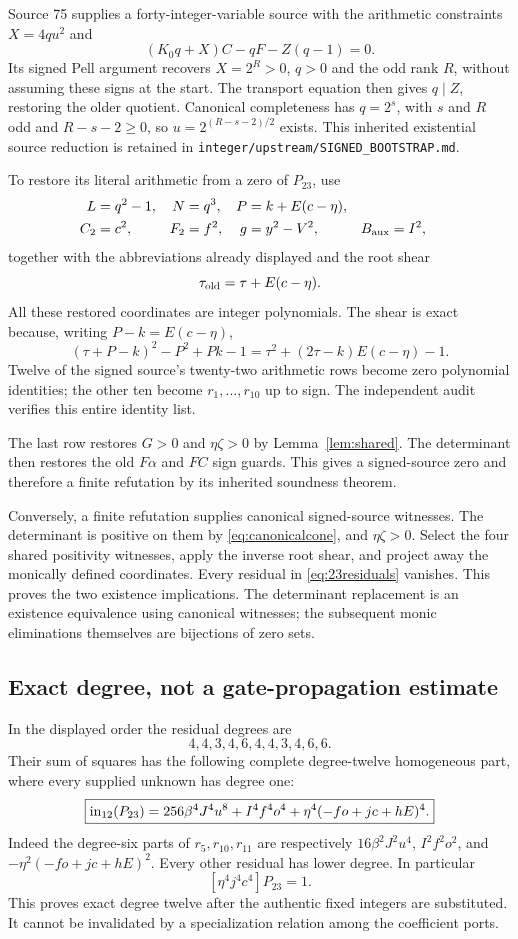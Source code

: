 Source 75 supplies a forty-integer-variable source with the arithmetic
constraints $X=4qu^2$ and
\[
 (K_0q+X)C-qF-Z(q-1)=0.
\]
Its signed Pell argument recovers $X=2^R>0$, $q>0$ and the odd rank
$R$, without assuming these signs at the start. The transport equation
then gives $q\mid Z$, restoring the older quotient. Canonical
completeness has $q=2^s$, with $s$ and $R$ odd and $R-s-2\ge0$,
so $u=2^{(R-s-2)/2}$ exists. This inherited existential source reduction
is retained in \texttt{integer/upstream/SIGNED\_BOOTSTRAP.md}.

To restore its literal arithmetic from a zero of $P_{23}$, use
\begin{align*}
 L&=q^2-1,&N&=q^3,&P&=k+E(c-\eta),\\
 C_2&=c^2,&F_2&=f^2,&g&=y^2-V^2,&B_{\rm aux}&=I^2,
\end{align*}
together with the abbreviations already displayed and the root shear
\[
 \tau_{\rm old}=\tau+E(c-\eta).
\]
All these restored coordinates are integer polynomials. The shear is
exact because, writing $P-k=E(c-\eta)$,
\[
 (\tau+P-k)^2-P^2+Pk-1
 =\tau^2+(2\tau-k)E(c-\eta)-1.
\]
Twelve of the signed source's twenty-two arithmetic rows become zero
polynomial identities; the other ten become $r_1,\ldots,r_{10}$ up to
sign. The independent audit verifies this entire identity list.

The last row restores $G>0$ and $\eta\zeta>0$ by
Lemma~\ref{lem:shared}. The determinant then restores the old
$F\alpha$ and $FC$ sign guards. This gives a signed-source zero and
therefore a finite refutation by its inherited soundness theorem.

Conversely, a finite refutation supplies canonical signed-source
witnesses. The determinant is positive on them by
\eqref{eq:canonicalcone}, and $\eta\zeta>0$. Select the four shared
positivity witnesses, apply the inverse root shear, and project away the
monically defined coordinates. Every residual in \eqref{eq:23residuals}
vanishes. This proves the two existence implications. The determinant
replacement is an existence equivalence using canonical witnesses;
the subsequent monic eliminations themselves are bijections of zero sets.

\subsection{Exact degree, not a gate-propagation estimate}

In the displayed order the residual degrees are
\[
 4,4,3,4,6,4,4,3,4,6,6.
\]
Their sum of squares has the following complete degree-twelve homogeneous
part, where every supplied unknown has degree one:
\begin{equation}
 \boxed{\operatorname{in}_{12}(P_{23})=
 256\beta^4J^4u^8+I^4f^4o^4
       +\eta^4(-fo+jc+hE)^4.}
 \label{eq:leading23}
\end{equation}
Indeed the degree-six parts of $r_5,r_{10},r_{11}$ are respectively
$16\beta^2J^2u^4$, $I^2f^2o^2$, and
$-\eta^2(-fo+jc+hE)^2$. Every other residual has lower degree.
In particular
\[
 [\eta^4j^4c^4]P_{23}=1.
\]
This proves exact degree twelve after the authentic fixed integers are
substituted. It cannot be invalidated by a specialization relation among
the coefficient ports.

